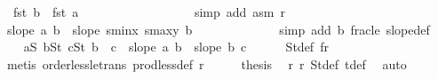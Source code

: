 \begin{isabellebody}
\ {}{\isacharcolon}{\kern0pt}\ {\isachardoublequoteopen}{\isacharparenleft}{\kern0pt}fst\ b\ {\isacharminus}{\kern0pt}\ fst\ a{\isacharparenright}{\kern0pt}\ {\isachargreater}{\kern0pt}\ {}{\isachardoublequoteclose}\ \ \ \ \ \ \ \ \ \ \ \ \ \ \ \isamarkupfalse%
\ {\isacharparenleft}{\kern0pt}simp\ add{\isacharcolon}{\kern0pt}\ asm{\isacharparenleft}{\kern0pt}{}{\isacharcomma}{\kern0pt}{}{\isacharparenright}{\kern0pt}\ r{}{\isacharparenright}{\kern0pt}\isanewline
\ \ \ \ \isamarkupfalse%
\ {\isachardoublequoteopen}slope\ a\ b\ {\isasymge}\ slope\ {\isacharparenleft}{\kern0pt}s{}{\isacharunderscore}{\kern0pt}minx{\isacharcomma}{\kern0pt}\ s{}{\isacharunderscore}{\kern0pt}maxy{\isacharparenright}{\kern0pt}\ b{\isachardoublequoteclose}\ \isamarkupfalse%
\ {}\ {}\ {}\ {}\isanewline
\ \ \ \ \ \ \isamarkupfalse%
\ {\isacharparenleft}{\kern0pt}simp\ add{\isacharcolon}{\kern0pt}\ b{}{\isacharparenleft}{\kern0pt}{}{\isacharparenright}{\kern0pt}\ frac{\isacharunderscore}{\kern0pt}le\ slope{\isacharunderscore}{\kern0pt}def{\isacharparenright}{\kern0pt}\isanewline
\ \ \isamarkupfalse%
\isanewline
\ \ \isamarkupfalse%
\ {\isachardoublequoteopen}{\isasymforall}a{\isasymin}S{}{\isachardot}{\kern0pt}\ {\isasymforall}b{\isasymin}S{}t{\isachardot}{\kern0pt}\ {\isasymforall}c{\isasymin}S{}t{\isachardot}{\kern0pt}\ b\ {\isacharless}{\kern0pt}\ c\ {\isasymlongrightarrow}\ slope\ a\ b\ {\isachargreater}{\kern0pt}\ slope\ b\ c{\isachardoublequoteclose}\isanewline
\ \ \ \ \isamarkupfalse%
\ S{}t{\isacharunderscore}{\kern0pt}def\ f{}r{}\isanewline
\ \ \ \ \isamarkupfalse%
\ {\isacharparenleft}{\kern0pt}metis\ order{\isacharunderscore}{\kern0pt}less{\isacharunderscore}{\kern0pt}le{\isacharunderscore}{\kern0pt}trans\ prod{\isacharunderscore}{\kern0pt}less{\isacharunderscore}{\kern0pt}def\ r{}{\isacharparenright}{\kern0pt}\isanewline
\ \ \isamarkupfalse%
\ \isamarkupfalse%
\ {\isacharquery}{\kern0pt}thesis\ \isamarkupfalse%
\ r{}\ r{}\ S{}t{\isacharunderscore}{\kern0pt}def\ t{\isacharunderscore}{\kern0pt}def\ \isamarkupfalse%
\ auto\isanewline
{}\isamarkupfalse%

\end{isabellebody}
